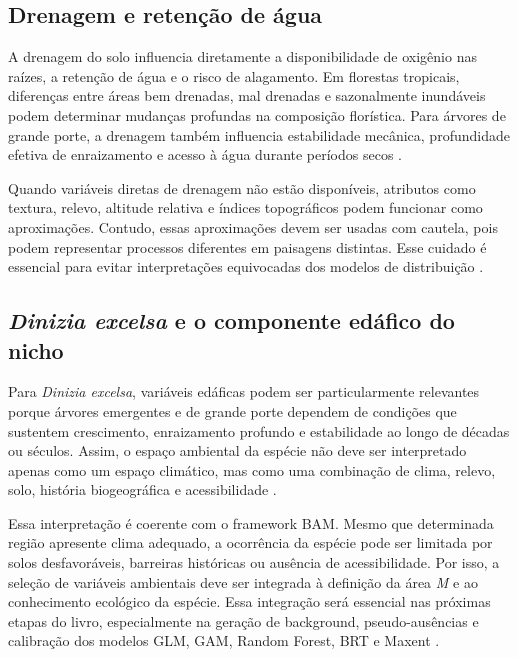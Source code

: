 \subsection{Drenagem e retenção de água}

A drenagem do solo influencia diretamente a disponibilidade de oxigênio nas raízes, a retenção de água e o risco de alagamento. Em florestas tropicais, diferenças entre áreas bem drenadas, mal drenadas e sazonalmente inundáveis podem determinar mudanças profundas na composição florística. Para árvores de grande porte, a drenagem também influencia estabilidade mecânica, profundidade efetiva de enraizamento e acesso à água durante períodos secos \parencite{tuomisto2019diversity,franklin2010mapping}.

Quando variáveis diretas de drenagem não estão disponíveis, atributos como textura, relevo, altitude relativa e índices topográficos podem funcionar como aproximações. Contudo, essas aproximações devem ser usadas com cautela, pois podem representar processos diferentes em paisagens distintas. Esse cuidado é essencial para evitar interpretações equivocadas dos modelos de distribuição \parencite{elith2009species,guisan2017habitat}.

\subsection{\textit{Dinizia excelsa} e o componente edáfico do nicho}

Para \textit{Dinizia excelsa}, variáveis edáficas podem ser particularmente relevantes porque árvores emergentes e de grande porte dependem de condições que sustentem crescimento, enraizamento profundo e estabilidade ao longo de décadas ou séculos. Assim, o espaço ambiental da espécie não deve ser interpretado apenas como um espaço climático, mas como uma combinação de clima, relevo, solo, história biogeográfica e acessibilidade \parencite{franklin2010mapping,peterson2011ecological}.

Essa interpretação é coerente com o framework BAM. Mesmo que determinada região apresente clima adequado, a ocorrência da espécie pode ser limitada por solos desfavoráveis, barreiras históricas ou ausência de acessibilidade. Por isso, a seleção de variáveis ambientais deve ser integrada à definição da área \textit{M} e ao conhecimento ecológico da espécie. Essa integração será essencial nas próximas etapas do livro, especialmente na geração de background, pseudo-ausências e calibração dos modelos GLM, GAM, Random Forest, BRT e Maxent \parencite{soberon2007grinnellian,zurell2020standard}.

